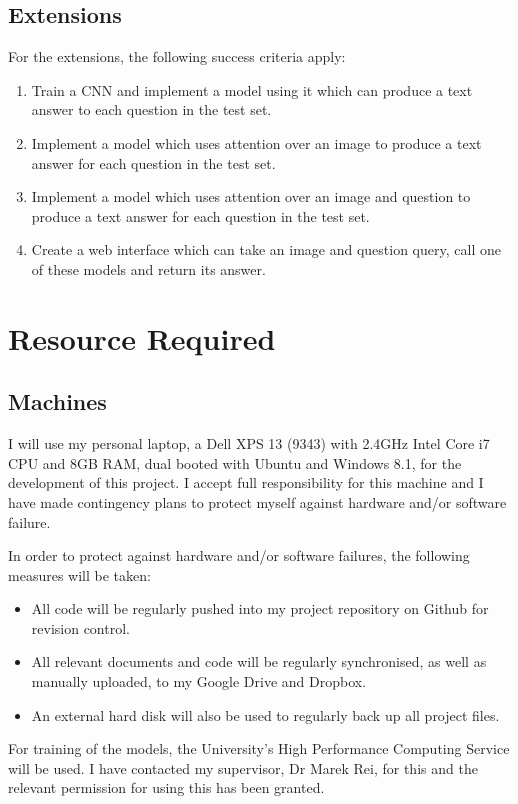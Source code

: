 \documentclass[12pt,a4paper,twoside]{article}
\begin{document}
\subsection{Extensions}
For the extensions, the following success criteria apply:
\setlength{\parskip}{0em}
\begin{enumerate}
	\item Train a CNN and implement a model using it which can produce a text answer to each question in the test set.
	\item Implement a model which uses attention over an image to produce a text answer for each question in the test set.
	\item Implement a model which uses attention over an image and question to produce a text answer for each question in the test set.
	\item Create a web interface which can take an image and question query, call one of these models and return its answer.
\end{enumerate}
\setlength{\parskip}{1em}

\section{Resource Required}
\subsection{Machines}
I will use my personal laptop, a Dell XPS 13 (9343) with 2.4GHz Intel Core i7 CPU and 8GB RAM, dual booted with Ubuntu and Windows 8.1, for the development of this project. I accept full responsibility for this machine and I have made contingency plans to protect myself against hardware and/or software failure.

In order to protect against hardware and/or software failures, the following measures will be taken:
\setlength{\parskip}{0em}
\begin{itemize}
	\renewcommand{\labelitemi}{\textbullet}
	\item All code will be regularly pushed into my project repository on Github for revision control.
	\item All relevant documents and code will be regularly synchronised, as well as manually uploaded, to my Google Drive and Dropbox.
	\item An external hard disk will also be used to regularly back up all project files.
\end{itemize}

For training of the models, the University's High Performance Computing Service will be used. I have contacted my supervisor, Dr Marek Rei, for this and the relevant permission for using this has been granted.
\end{document}
